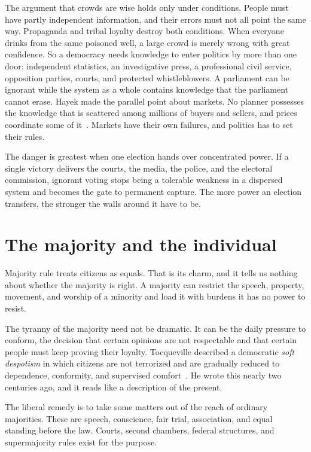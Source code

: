 \documentclass[12pt,a4paper]{book}
\begin{document}
The argument that crowds are wise holds only under conditions. People must have partly independent information, and their errors must not all point the same way. Propaganda and tribal loyalty destroy both conditions. When everyone drinks from the same poisoned well, a large crowd is merely wrong with great confidence. So a democracy needs knowledge to enter politics by more than one door: independent statistics, an investigative press, a professional civil service, opposition parties, courts, and protected whistleblowers. A parliament can be ignorant while the system as a whole contains knowledge that the parliament cannot erase. Hayek made the parallel point about markets. No planner possesses the knowledge that is scattered among millions of buyers and sellers, and prices coordinate some of it~\cite{Hayek-45}. Markets have their own failures, and politics has to set their rules.

The danger is greatest when one election hands over concentrated power. If a single victory delivers the courts, the media, the police, and the electoral commission, ignorant voting stops being a tolerable weakness in a dispersed system and becomes the gate to permanent capture. The more power an election transfers, the stronger the walls around it have to be.

\section{The majority and the individual}

Majority rule treats citizens as equals. That is its charm, and it tells us nothing about whether the majority is right. A majority can restrict the speech, property, movement, and worship of a minority and load it with burdens it has no power to resist.

The tyranny of the majority need not be dramatic. It can be the daily pressure to conform, the decision that certain opinions are not respectable and that certain people must keep proving their loyalty. Tocqueville described a democratic \emph{soft despotism} in which citizens are not terrorized and are gradually reduced to dependence, conformity, and supervised comfort~\cite{Tocqueville1835}. He wrote this nearly two centuries ago, and it reads like a description of the present.

The liberal remedy is to take some matters out of the reach of ordinary majorities. These are speech, conscience, fair trial, association, and equal standing before the law. Courts, second chambers, federal structures, and supermajority rules exist for the purpose.
\end{document}
